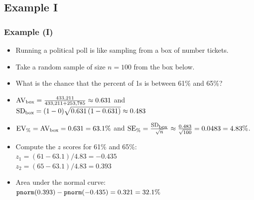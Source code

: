 \documentclass[t]{beamer}
\begin{document}
\subsection{Example I}
\begin{frame}
\frametitle{Example (I)}

\footnotesize

\begin{itemize}
\item Running a political poll is like sampling from a box of number tickets.
\item<2-> Take a random sample of size $n=100$ from the box below.
\begin{center}
\vspace{2pt}
\end{center}
\item<3->  What is the chance that the percent of 1s is between 61\% and 65\%?
\item<4-> $\mbox{AV}_{\mbox{\scriptsize box}}=\frac{433,211}{433,211 + 253,785} \approx 0.631$
and $\mbox{SD}_{\mbox{\scriptsize box}}=(1-0)\sqrt{0.631\,(1-0.631)} \approx 0.483$
\item<5-> $\mbox{EV}_{\mbox{\scriptsize \%}}=\mbox{AV}_{\mbox{\scriptsize box}}=0.631=63.1\%$
 and $\mbox{SE}_{\mbox{\scriptsize \%}}=
    \frac{\footnotesize\mbox{SD}_{\mbox{\scriptsize box}}}{\sqrt{n}}\approx 
    \frac{0.483}{\sqrt{100}} = 0.0483 = 4.83\%$.
\item<6-> Compute the $z$ scores for 61\% and 65\%:\\
   $z_1=(61 - 63.1)/4.83 = -0.435$\\[2pt]
   $z_2=(65 - 63.1)/4.83 = 0.393$\\
\item<7->  Area under the normal curve:~{\scriptsize $\mbox{\texttt{pnorm}}(0.393) - \mbox{\texttt{pnorm}}(-0.435) = 0.321=32.1\%$}
\end{itemize}

\end{frame}
\end{document}
